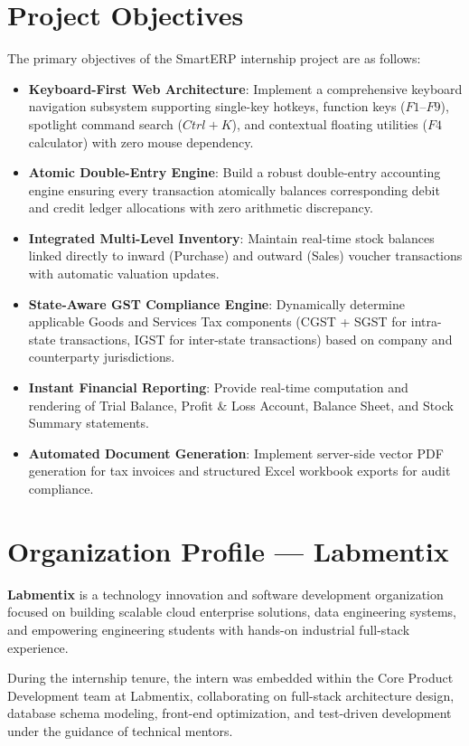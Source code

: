 \section{Project Objectives}
The primary objectives of the SmartERP internship project are as follows:
\begin{itemize}
    \item \textbf{Keyboard-First Web Architecture}: Implement a comprehensive keyboard navigation subsystem supporting single-key hotkeys, function keys ($F1$--$F9$), spotlight command search ($Ctrl+K$), and contextual floating utilities ($F4$ calculator) with zero mouse dependency.
    \item \textbf{Atomic Double-Entry Engine}: Build a robust double-entry accounting engine ensuring every transaction atomically balances corresponding debit and credit ledger allocations with zero arithmetic discrepancy.
    \item \textbf{Integrated Multi-Level Inventory}: Maintain real-time stock balances linked directly to inward (Purchase) and outward (Sales) voucher transactions with automatic valuation updates.
    \item \textbf{State-Aware GST Compliance Engine}: Dynamically determine applicable Goods and Services Tax components (CGST + SGST for intra-state transactions, IGST for inter-state transactions) based on company and counterparty jurisdictions.
    \item \textbf{Instant Financial Reporting}: Provide real-time computation and rendering of Trial Balance, Profit \& Loss Account, Balance Sheet, and Stock Summary statements.
    \item \textbf{Automated Document Generation}: Implement server-side vector PDF generation for tax invoices and structured Excel workbook exports for audit compliance.
\end{itemize}

\section{Organization Profile --- Labmentix}
\textbf{Labmentix} is a technology innovation and software development organization focused on building scalable cloud enterprise solutions, data engineering systems, and empowering engineering students with hands-on industrial full-stack experience. 

During the internship tenure, the intern was embedded within the Core Product Development team at Labmentix, collaborating on full-stack architecture design, database schema modeling, front-end optimization, and test-driven development under the guidance of technical mentors.

